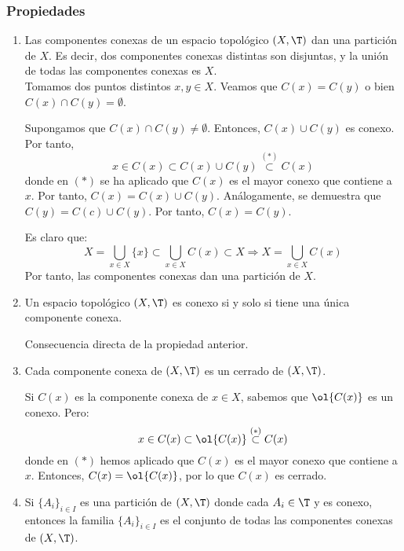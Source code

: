 \subsubsection{Propiedades}
\begin{enumerate}
    \item Las componentes conexas de un espacio topológico $(X,\T)$ dan una partición de $X$. Es decir, dos componentes conexas distintas son disjuntas, y la unión de todas las componentes conexas es $X$.\\

    Tomamos dos puntos distintos $x,y\in X$. Veamos que $C(x)=C(y)$ o bien $C(x)\cap C(y)=\emptyset$.

    Supongamos que $C(x)\cap C(y)\neq \emptyset$. Entonces, $C(x)\cup C(y)$ es conexo. Por tanto,
    \begin{equation*}
        x\in C(x)\subset C(x)\cup C(y) \stackrel{(\ast)}{\subset} C(x)
    \end{equation*}
    donde en $(\ast)$ se ha aplicado que $C(x)$ es el mayor conexo que contiene a $x$. Por tanto, $C(x)=C(x)\cup C(y)$. Análogamente, se demuestra que $C(y)=C(c)\cup C(y)$. Por tanto, $C(x)=C(y)$.

    Es claro que:
    \begin{equation*}
        X=\bigcup_{x\in X}\{x\} \subset \bigcup_{x\in X}C(x)\subset X \Longrightarrow X=\bigcup_{x\in X}C(x)
    \end{equation*}
    Por tanto, las componentes conexas dan una partición de $X$.

    \item Un espacio topológico $(X,\T)$ es conexo si y solo si tiene una única componente conexa.

    Consecuencia directa de la propiedad anterior.

    \item Cada componente conexa de $(X,\T)$ es un cerrado de $(X,\T)$.

    Si $C(x)$ es la componente conexa de $x\in X$, sabemos que $\ol{C(x)}$ es un conexo. Pero:
    \begin{equation*}
        x\in C(x)\subset \ol{C(x)} \stackrel{(\ast)}{\subset} C(x)
    \end{equation*}
    donde en $(\ast)$ hemos aplicado que $C(x)$ es el mayor conexo que contiene a $x$. Entonces, $C(x)=\ol{C(x)}$, por lo que $C(x)$ es cerrado.

    \item Si ${\{A_i\}}_{i\in I}$ es una partición de $(X,\T)$ donde cada $A_i\in \T$ y es conexo, entonces la familia ${\{A_i\}}_{i\in I}$ es el conjunto de todas las componentes conexas de $(X,\T)$.
\end{enumerate}


